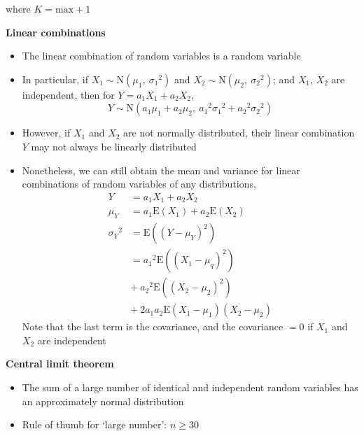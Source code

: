 \documentclass[a4paper]{article}
\newcommand{\heading}[1]{{\small\textbf{#1}}}
\newcommand{\subheading}[1]{{\scriptsize\textbf{#1}}}
\begin{document}
\begin{multicols*}{4}
\begin{itemize}
    where $K = \mathrm{max} + 1$
\end{itemize}

\heading{Linear combinations}
\begin{itemize} \itemsep -0.5em
    \item The linear combination of random variables is a random
        variable
    \item In particular, if $X_1\sim \mathrm{N}(\mu_1,\ {\sigma_1}^2)$
        and $X_2\sim \mathrm{N}(\mu_2,\ {\sigma_2}^2)$; and $X_1$, 
        $X_2$ are independent, then for $Y = a_1X_1 + a_2X_2$,
        $$Y \sim \mathrm{N}(a_1\mu_1 + a_2\mu_2,\ 
            {a_1}^2{\sigma_1}^2 + {a_2}^2{\sigma_2}^2)$$
    \item However, if $X_1$ and $X_2$ are not normally distributed,
        their linear combination $Y$ may not always be linearly
        distributed
    \item Nonetheless, we can still obtain the mean and variance for
        linear combinations of random variables of any distributions,
        \begin{align*}
            Y &= a_1X_1 + a_2X_2\\
            \mu_Y &= a_1\mathrm{E}(X_1) + a_2\mathrm{E}(X_2) \\
            {\sigma_Y}^2 &= \mathrm{E}((Y-\mu_Y)^2) \\
                &= {a_1}^2\mathrm{E}((X_1-\mu_q)^2) \\
                &+\ {a_2}^2\mathrm{E}((X_2-\mu_2)^2)\\
                &+\  2a_1a_2\mathrm{E}(X_1-\mu_1)(X_2-\mu_2)
        \end{align*}
        Note that the last term is the covariance, and the covariance 
        $=0$ if $X_1$ and $X_2$ are independent
\end{itemize}
\subheading{Central limit theorem}
\begin{itemize} \itemsep -0.5em
    \item The sum of a large number of identical and independent random
        variables has an approximately normal distribution
    \item Rule of thumb for `large number': $n \geq 30$
\end{itemize}


\end{multicols*}
\end{document}
